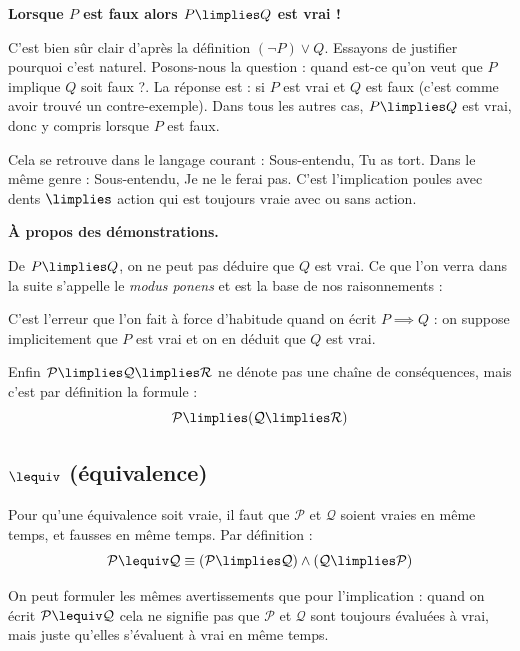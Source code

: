 \documentclass[11pt,class=report,crop=false]{standalone}
\begin{document}
\medskip

\textbf{Lorsque $P$ est faux alors $P \limplies Q$ est vrai !}

C'est bien sûr clair d'après la définition $(\lnot P) \lor Q$.
Essayons de justifier pourquoi c'est naturel. 
Posons-nous la question : \og{}quand est-ce qu'on veut que $P$ implique $Q$ soit faux ?\fg{}. La réponse est : \og{}si $P$ est vrai et $Q$ est faux\fg{} (c'est comme avoir trouvé un contre-exemple). Dans tous les autres cas, $P \limplies Q$ est vrai, donc y compris lorsque $P$ est faux.

Cela se retrouve dans le langage courant :
Sous-entendu, \og{}Tu as tort.\fg{}
Dans le même genre :
Sous-entendu, \og{}Je ne le ferai pas.\fg{} C'est l'implication \og{}poules avec dents $\limplies$ action\fg{} qui est toujours vraie avec ou sans action.


\medskip

\textbf{À propos des démonstrations.}

De $P \limplies Q$, on ne peut pas déduire que $Q$ est vrai. Ce que l'on verra dans la suite s'appelle le \emph{modus ponens} et est la base de nos raisonnements :

C'est l'erreur que l'on fait à force d'habitude quand on écrit $P \implies Q$ : on suppose implicitement que $P$ est vrai et on en déduit que $Q$ est vrai.

Enfin $\mathcal{P} \limplies \mathcal{Q} \limplies \mathcal{R}$ ne dénote pas une chaîne de conséquences, mais c'est par définition la formule :
\[ \mathcal{P} \limplies (\mathcal{Q} \limplies \mathcal{R}) \]



\subsection{$\lequiv$ (équivalence)}

Pour qu'une équivalence soit vraie, il faut que $\mathcal{P}$ et $\mathcal{Q}$ soient vraies en même temps, et fausses en même temps.
Par définition :
\[ \mathcal{P} \lequiv \mathcal{Q} \equiv (\mathcal{P} \limplies \mathcal{Q}) \land (\mathcal{Q} \limplies \mathcal{P}) \]

On peut formuler les mêmes avertissements que pour l'implication : quand on écrit $\mathcal{P} \lequiv \mathcal{Q}$ cela ne signifie pas que $\mathcal{P}$ et $\mathcal{Q}$ sont toujours évaluées à vrai, mais juste qu'elles s'évaluent à vrai en même temps.
 
\end{document}
